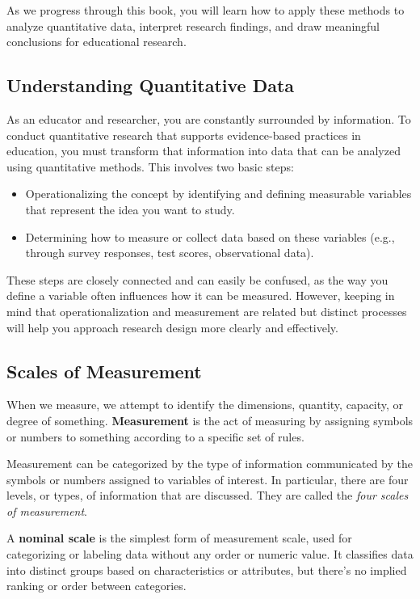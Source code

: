 \documentclass[
  letterpaper,
  DIV=11,
  numbers=noendperiod]{scrreprt}
\begin{document}
As we progress through this book, you will learn how to apply these
methods to analyze quantitative data, interpret research findings, and
draw meaningful conclusions for educational research.

\subsection{Understanding Quantitative
Data}\label{understanding-quantitative-data}

As an educator and researcher, you are constantly surrounded by
information. To conduct quantitative research that supports
evidence-based practices in education, you must transform that
information into data that can be analyzed using quantitative methods.
This involves two basic steps:

\begin{itemize}
\item
  Operationalizing the concept by identifying and defining measurable
  variables that represent the idea you want to study.
\item
  Determining how to measure or collect data based on these variables
  (e.g., through survey responses, test scores, observational data).
\end{itemize}

These steps are closely connected and can easily be confused, as the way
you define a variable often influences how it can be measured. However,
keeping in mind that operationalization and measurement are related but
distinct processes will help you approach research design more clearly
and effectively.

\subsection{Scales of Measurement}\label{scales-of-measurement}

When we measure, we attempt to identify the dimensions, quantity,
capacity, or degree of something. \textbf{Measurement} is the act of
measuring by assigning symbols or numbers to something according to a
specific set of rules.

Measurement can be categorized by the type of information communicated
by the symbols or numbers assigned to variables of interest. In
particular, there are four levels, or types, of information that are
discussed. They are called the \emph{four scales of measurement}.

A \textbf{nominal scale} is the simplest form of measurement scale, used
for categorizing or labeling data without any order or numeric value. It
classifies data into distinct groups based on characteristics or
attributes, but there's no implied ranking or order between categories.
\end{document}
